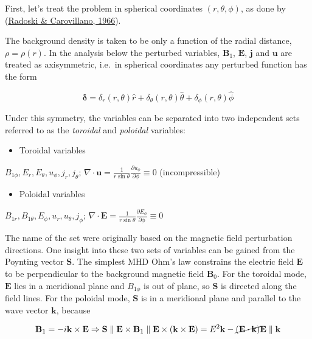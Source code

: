 \documentclass[
  notoc %
]{tufte-book}
\providecommand{\tightlist}{%
  \setlength{\itemsep}{0pt}\setlength{\parskip}{0pt}
}
\begin{document}
First, let's treat the problem in spherical coordinates
\((r,\theta,\phi)\), as done by
(\protect\hyperlink{ref-radoski1966}{Radoski \& Carovillano, 1966}).

The background density is taken to be only a function of the radial
distance, \(\rho = \rho(r)\). In the analysis below the perturbed
variables, \(\mathbf{B}_1\), \(\mathbf{E}\), \(\mathbf{j}\) and
\(\mathbf{u}\) are treated as axisymmetric, i.e.~in spherical
coordinates any perturbed function has the form

\[
\mathbf{\delta} = \delta_r(r,\theta)\hat{r} + \delta_\theta(r,\theta)\hat{\theta} + \delta_\phi(r,\theta)\hat{\phi}
\]

Under this symmetry, the variables can be separated into two independent
sets referred to as the \emph{toroidal} and \emph{poloidal} variables:

\begin{itemize}
\tightlist
\item
  Toroidal variables
\end{itemize}

\(B_{1\phi}, E_r, E_\theta, u_\phi, j_r, j_\theta;\, \nabla\cdot\mathbf{u} = \frac{1}{r\sin\theta}\frac{\partial u_\phi}{\partial \phi}\equiv 0\)
(incompressible)

\begin{itemize}
\tightlist
\item
  Poloidal variables
\end{itemize}

\(B_{1r}, B_{1\theta}, E_\phi, u_r, u_\theta, j_\phi ;\, \nabla\cdot\mathbf{E} = \frac{1}{r\sin\theta}\frac{\partial E_\phi}{\partial \phi}\equiv 0\)

The name of the set were originally based on the magnetic field
perturbation directions. One insight into these two sets of variables
can be gained from the Poynting vector \(\mathbf{S}\). The simplest MHD
Ohm's law constrains the electric field \(\mathbf{E}\) to be
perpendicular to the background magnetic field \(\mathbf{B}_0\). For the
toroidal mode, \(\mathbf{E}\) lies in a meridional plane and
\(B_{1\phi}\) is out of plane, so \(\mathbf{S}\) is directed along the
field lines. For the poloidal mode, \(\mathbf{S}\) is in a meridional
plane and parallel to the wave vector \(\mathbf{k}\), because

\[\mathbf{B}_1 = -i\mathbf{k}\times\mathbf{E}\Rightarrow \mathbf{S}\parallel\mathbf{E}\times\mathbf{B}_1 \parallel \mathbf{E}\times(\mathbf{k}\times\mathbf{E})=E^2\mathbf{k} - \cancel{(\mathbf{E}\cdot\mathbf{k})}\mathbf{E} \parallel \mathbf{k}
\]
\end{document}
